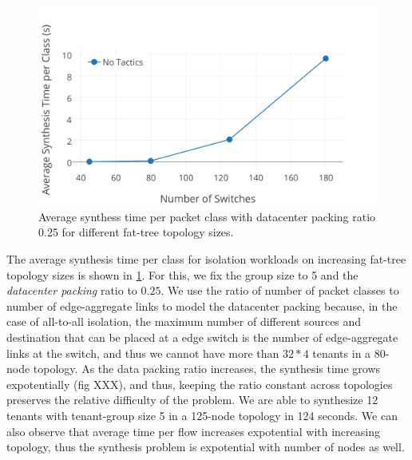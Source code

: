 \begin{figure}[H]
		\includegraphics[width=\columnwidth]{figures/no-tactic-topo.png}
		\caption{Average synthess time per packet class with datacenter packing ratio 0.25 for different fat-tree topology sizes.}
		\label{fig:no-tactic-topo}
\end{figure}


The average synthesis time per class for isolation workloads
 on increasing fat-tree topology sizes is shown in \cref{fig:no-tactic-topo}. For this, we fix the group size to 5 and
  the {\em datacenter packing} ratio to $0.25$. We use the ratio of number 
  of packet classes to number of edge-aggregate links to model the datacenter 
  packing because, in the case of all-to-all isolation, the maximum number 
  of different sources and destination that can be placed at a edge switch is the number of edge-aggregate links at the switch, and thus we cannot have more than $32*4$ tenants in a 80-node topology. As the data packing ratio increases, the synthesis time grows expotentially (fig XXX), 
  and thus, keeping the ratio constant across topologies preserves the 
  relative difficulty of the problem. We are able to synthesize 12 tenants 
  with tenant-group size 5 in a 125-node topology in 124 seconds. 
  We can also observe that average time per flow increases expotential 
  with increasing topology, thus the synthesis problem is expotential with number of nodes as well. 

